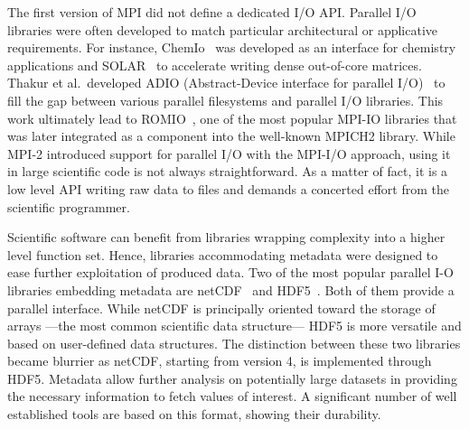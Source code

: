 The first version of MPI did not define a dedicated I/O API. Parallel I/O
libraries were often developed to match particular architectural or applicative
requirements. For instance, ChemIo~\cite{Nieplocha1998} was developed as an
interface for chemistry applications and SOLAR~\cite{Toledo1996} to accelerate
writing dense out-of-core matrices. Thakur et al.\ developed ADIO
(Abstract-Device interface for parallel I/O)~\cite{Thakur1996}
to fill the gap between various parallel filesystems and parallel I/O libraries.
This work ultimately lead to ROMIO~\cite{Thakur1999}, one of the most popular
MPI-IO libraries that was later integrated as a component into the well-known
MPICH2 library. While MPI-2 introduced support for parallel I/O with the MPI-I/O
approach, using it in large scientific code is not always straightforward. As a
matter of fact, it is a low level API writing raw data to files and demands a
concerted effort from the scientific programmer.


Scientific software can benefit from libraries wrapping complexity into a higher
level function set. Hence, libraries accommodating metadata were designed to
ease further exploitation of produced data. Two of the most popular parallel I-O
libraries embedding metadata are netCDF~\cite{Li2003} and
HDF5~\cite{Howison2010}. Both of them provide a parallel interface. While netCDF
is principally oriented toward the storage of arrays ---the most common
scientific data structure--- HDF5 is more versatile and based on user-defined data
structures. The distinction between these two libraries became blurrier as
netCDF, starting from version 4, is implemented through HDF5. Metadata allow
further analysis on potentially large datasets in providing the necessary
information to fetch values of interest. A significant number of well
established tools are based on this format, showing their durability.



